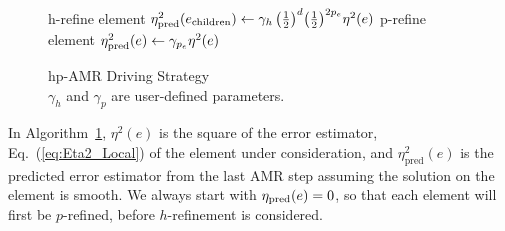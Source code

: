 \begin{figure}
  \begin{algorithm}[H]
    \caption{\label{alg:hpamr}
      hp-AMR Driving Strategy\\
      $\gamma_{h}$ and $\gamma_{p}$ are user-defined parameters.
    }
    \begin{algorithmic}[1]
           \State h-refine element
          \State $\eta^2_{\rm pred}(e_{\textrm{children}}) \gets \gamma_{h}\,\big(\frac{1}{2}\big)^{d}\big(\frac{1}{2}\big)^{2p_e}\eta^{2}(e)$
          \Else
                     \State p-refine element
          \State $\eta^2_{\rm pred}(e) \gets \gamma_{p_e}\eta^2(e)$
          \EndIf
        \EndIf
      \EndProcedure
    \end{algorithmic}
  \end{algorithm}
\end{figure}

In Algorithm~\ref{alg:hpamr}, $\eta^2(e)$ is the square of the error
estimator, Eq.~(\ref{eq:Eta2_Local}) of the element under
  consideration, and $\eta_{\text{pred}}^2(e)$ is the predicted error
  estimator from the last AMR step assuming the solution on the
  element is smooth. We always start with $\eta_{\rm pred}(e)=0$, so that
  each element will first be $p$-refined, before $h$-refinement is
  considered.

